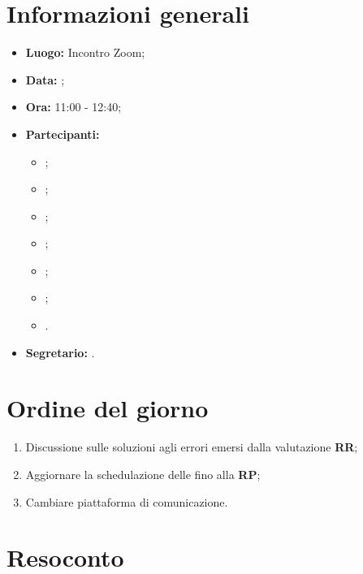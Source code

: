 \section{Informazioni generali}
\begin{itemize}
\item \textbf{Luogo:} Incontro Zoom;
\item \textbf{Data:} \Data;
\item \textbf{Ora:} 11:00 - 12:40;
\item \textbf{Partecipanti:}
	\begin{itemize}
		\item \BL{}; 
		\item \FF{};
		\item \MM{}; 
		\item \PC{};
		\item \TG{};
		\item \TL{};
		\item \VD{}.
	\end{itemize} 
\item \textbf{Segretario:} \TL{}.
\end{itemize}

\section{Ordine del giorno}
\begin{enumerate}
 \item Discussione sulle soluzioni agli errori emersi dalla valutazione \textbf{RR};
 \item Aggiornare la schedulazione delle  fino alla \textbf{RP};
 \item Cambiare piattaforma di comunicazione.
\end{enumerate}

\section{Resoconto}
